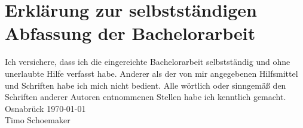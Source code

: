 \chapter*{Erklärung zur selbstständigen Abfassung der Bachelorarbeit}

Ich versichere, dass ich die eingereichte Bachelorarbeit selbstständig und ohne unerlaubte Hilfe verfasst habe. Anderer als der von mir angegebenen Hilfsmittel und Schriften habe ich mich nicht bedient. Alle wörtlich oder sinngemäß den Schriften anderer Autoren entnommenen Stellen habe ich kenntlich gemacht. \\


\bigskip
\bigskip
\bigskip
\bigskip
\noindent
Osnabrück \today\\

\bigskip
\bigskip
\bigskip
\bigskip
\noindent
Timo Schoemaker